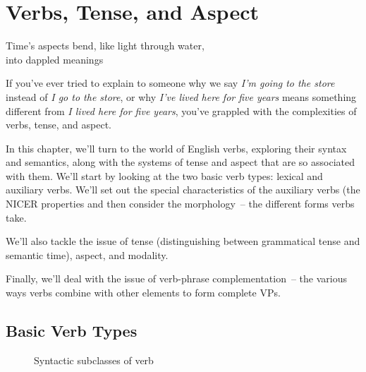 \chapter{Verbs, Tense, and Aspect}

\epigraph{Time's aspects bend, like light through water,\\\phantom{~}\hfill into dappled meanings}{}

If you've ever tried to explain to someone why we say \textit{I'm going to the store} instead of \textit{I go to the store}, or why \textit{I've lived here for five years} means something different from \textit{I lived here for five years}, you've grappled with the complexities of verbs, tense, and aspect.

In this chapter, we'll turn to the world of English verbs, exploring their syntax and semantics, along with the systems of tense and aspect that are so associated with them. We'll start by looking at the two basic verb types: lexical and auxiliary verbs. We'll set out the special characteristics of the auxiliary verbs (the NICER properties and then consider the morphology~-- the different forms verbs take.

We'll also tackle the issue of tense (distinguishing between grammatical tense and semantic time), aspect, and modality.

Finally, we'll deal with the issue of verb-phrase complementation~-- the various ways verbs combine with other elements to form complete VPs.

\section{Basic Verb Types}\label{sec:basic-verb-types}

\begin{figure}[ht]
    \centering
    \caption{Syntactic subclasses of verb}
    \label{fig:verb-structure}
\end{figure}

